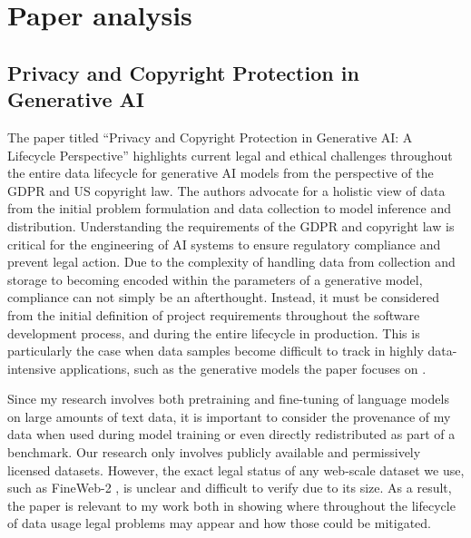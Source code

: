 \documentclass[11pt]{article}
\begin{document}
\section{Paper analysis}

\subsection{Privacy and Copyright Protection in Generative AI}

 The paper titled ``Privacy and Copyright Protection in Generative AI: A Lifecycle Perspective'' \parencite{10556135} highlights current legal and ethical challenges throughout the entire data lifecycle for generative AI models from the perspective of the GDPR and US copyright law. The authors advocate for a holistic view of data from the initial problem formulation and data collection to model inference and distribution. Understanding the requirements of the GDPR and copyright law is critical for the engineering of AI systems to ensure regulatory compliance and prevent legal action. Due to the complexity of handling data from collection and storage to becoming encoded within the parameters of a generative model, compliance can not simply be an afterthought. Instead, it must be considered from the initial definition of project requirements throughout the software development process, and during the entire lifecycle in production.
 This is particularly the case when data samples become difficult to track in highly data-intensive applications, such as the generative models the paper focuses on \parencite{10556135}.

Since my research involves both pretraining and fine-tuning of language models on large amounts of text data, it is important to consider the provenance of my data when used during model training or even directly redistributed as part of a benchmark. Our research only involves publicly available and permissively licensed datasets. However, the exact legal status of any web-scale dataset we use, such as FineWeb-2 \parencite{penedo2025fineweb2pipelinescale}, is unclear and difficult to verify due to its size. As a result, the paper is relevant to my work both in showing where throughout the lifecycle of data usage legal problems may appear and how those could be mitigated.
\end{document}

